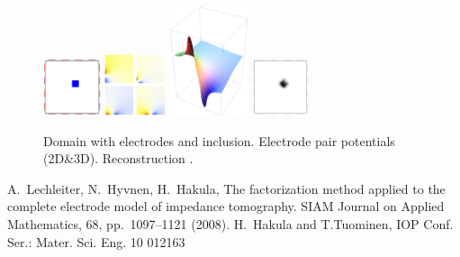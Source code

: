 \begin{figure}[h]
\centering
\includegraphics[width=0.15\textwidth]{./hakula/domain}\qquad
\includegraphics[width=0.16\textwidth]{./hakula/potentials}\qquad
\includegraphics[height=1.25in]{./hakula/potential3d}\qquad
\includegraphics[width=0.15\textwidth]{./hakula/reconstruction}\newline
\caption{Domain with electrodes and inclusion. Electrode pair potentials (2D\&3D). Reconstruction \cite{LHH}.}%
\label{fig}
\end{figure}


\begin{thebibliography}{10}

 {\sc A.~Lechleiter, N.~Hyvnen, H.~Hakula}, 
{The factorization method applied to the complete electrode model of impedance tomography}. SIAM Journal on Applied Mathematics, 68, pp.~1097--1121 (2008).
 {\sc H.~Hakula and T.Tuominen}, IOP Conf. Ser.: Mater. Sci. Eng. 10 012163

\end{thebibliography}